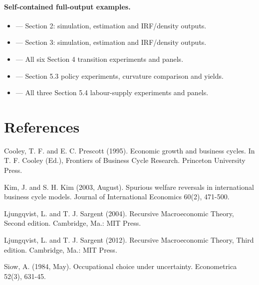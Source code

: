 \documentclass[12pt]{article}
\begin{document}
\paragraph{Self-contained full-output examples.}
\begin{itemize}
  \item {} --- Section 2: simulation, estimation and IRF/density outputs.
  \item {} --- Section 3: simulation, estimation and IRF/density outputs.
  \item {} --- All six Section 4 transition experiments and panels.
  \item {} --- Section 5.3 policy experiments, curvature comparison and yields.
  \item {} --- All three Section 5.4 labour-supply experiments and panels.
\end{itemize}

\section*{References}
Cooley, T. F. and E. C. Prescott (1995). Economic growth and business cycles. In T. F. Cooley (Ed.), Frontiers of Business Cycle Research. Princeton University Press.

Kim, J. and S. H. Kim (2003, August). Spurious welfare reversals in international business cycle models. Journal of International Economics 60(2), 471-500.

Ljungqvist, L. and T. J. Sargent (2004). Recursive Macroeconomic Theory, Second edition. Cambridge, Ma.: MIT Press.

Ljungqvist, L. and T. J. Sargent (2012). Recursive Macroeconomic Theory, Third edition. Cambridge, Ma.: MIT Press.

Siow, A. (1984, May). Occupational choice under uncertainty. Econometrica 52(3), 631-45.
\end{document}
